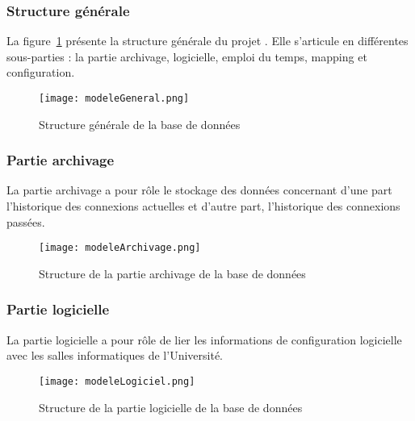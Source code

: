 \begin{appendices}
\begin{itemize}
\end{itemize}


\subsubsection{Structure g\'en\'erale}

La figure~\ref{annexe:modeleGeneral} pr\'esente la structure g\'en\'erale du projet \YuukouII.
Elle s'articule en diff\'erentes sous-parties : la partie archivage, logicielle, emploi du temps, mapping et configuration.

\begin{figure}[!ht]
	\centering
	\texttt{[image: modeleGeneral.png]}
	\caption{Structure g\'en\'erale de la base de donn\'ees}
	\label{annexe:modeleGeneral}

\end{figure}

\clearpage

\subsubsection{Partie archivage}

La partie archivage a pour r\^ole le stockage des donn\'ees concernant d'une part l'historique des connexions actuelles et d'autre part, l'historique des connexions pass\'ees.

\begin{figure}[!ht]
	\centering
	\texttt{[image: modeleArchivage.png]}
	\caption{Structure de la partie archivage de la base de donn\'ees}
	\label{annexe:modeleArchivage}

\end{figure}


\subsubsection{Partie logicielle}

La partie logicielle a pour r\^ole de lier les informations de configuration logicielle avec les salles informatiques de l'Universit\'e.

\clearpage

\begin{figure}[!ht]
	\centering
	\texttt{[image: modeleLogiciel.png]}
	\caption{Structure de la partie logicielle de la base de donn\'ees}
	\label{annexe:modeleLogiciel}

\end{figure}



\end{appendices}
